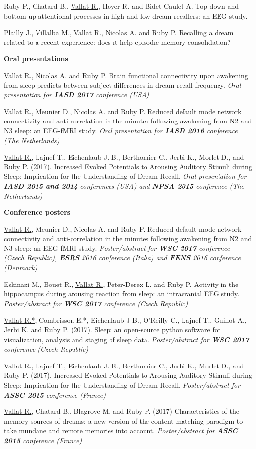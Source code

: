 Ruby P., Chatard B., \underline{Vallat R.}, Hoyer R. and Bidet-Caulet A. Top-down and bottom-up attentional processes in high and low dream recallers: an EEG study.

Plailly J., Villalba M., \underline{Vallat R.}, Nicolas A. and Ruby P. Recalling a dream related to a recent experience: does it help episodic memory consolidation?


\textbf{Oral presentations}

\underline{Vallat R.}, Nicolas A. and Ruby P. Brain functional connectivity upon awakening from sleep predicts between-subject differences in dream recall frequency. \emph{Oral presentation for \textbf{IASD 2017} conference (USA)}

\underline{Vallat R.}, Meunier D., Nicolas A. and Ruby P. Reduced default mode network connectivity and anti-correlation in the minutes following awakening from N2 and N3 sleep: an EEG-fMRI study. \emph{Oral presentation for \textbf{IASD 2016} conference (The Netherlands)}

\underline{Vallat R.}, Lajnef T., Eichenlaub J.-B., Berthomier C., Jerbi K., Morlet D., and Ruby P. (2017). Increased Evoked Potentials to Arousing Auditory Stimuli during Sleep: Implication for the Understanding of Dream Recall. \emph{Oral presentation for \textbf{IASD 2015 and 2014} conferences (USA) and \textbf{NPSA 2015} conference (The Netherlands)}

\textbf{Conference posters}

\underline{Vallat R.}, Meunier D., Nicolas A. and Ruby P. Reduced default mode network connectivity and anti-correlation in the minutes following awakening from N2 and N3 sleep: an EEG-fMRI study. \emph{Poster/abstract for \textbf{WSC 2017} conference (Czech Republic), \textbf{ESRS} 2016 conference (Italia) and \textbf{FENS} 2016 conference (Denmark)}

Eskinazi M., Bouet R., \underline{Vallat R.}, Peter-Derex L. and Ruby P. Activity in the hippocampus during arousing reaction from sleep: an intracranial EEG study. \emph{Poster/abstract for \textbf{WSC 2017} conference (Czech Republic)}

\underline{Vallat R.*}, Combrisson E.*, Eichenlaub J-B., O'Reilly C., Lajnef T., Guillot A., Jerbi K. and Ruby P. (2017). Sleep: an open-source python software for visualization, analysis and staging of sleep data. \emph{Poster/abstract for \textbf{WSC 2017} conference (Czech Republic)}

\underline{Vallat R.}, Lajnef T., Eichenlaub J.-B., Berthomier C., Jerbi K., Morlet D., and Ruby P. (2017). Increased Evoked Potentials to Arousing Auditory Stimuli during Sleep: Implication for the Understanding of Dream Recall. \emph{Poster/abstract for \textbf{ASSC 2015} conference (France)}

\underline{Vallat R.}, Chatard B., Blagrove M. and Ruby P. (2017) Characteristics of the memory sources of dreams: a new version of the content-matching paradigm to take mundane and remote memories into account. \emph{Poster/abstract for \textbf{ASSC 2015} conference (France)}
